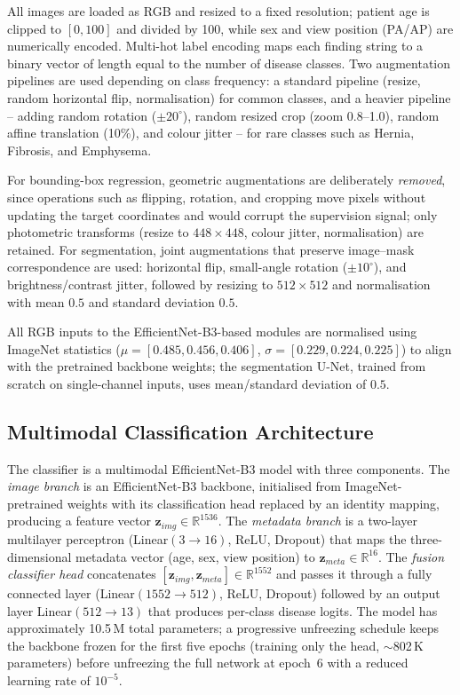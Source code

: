 \documentclass[preprint,12pt,authoryear]{elsarticle}
\begin{document}
All images are loaded as RGB and resized to a fixed resolution; patient age is clipped to $[0, 100]$ and divided by 100, while sex and view position (PA/AP) are numerically encoded. Multi-hot label encoding maps each finding string to a binary vector of length equal to the number of disease classes. Two augmentation pipelines are used depending on class frequency: a standard pipeline (resize, random horizontal flip, normalisation) for common classes, and a heavier pipeline -- adding random rotation ($\pm20^{\circ}$), random resized crop (zoom 0.8--1.0), random affine translation (10\%), and colour jitter -- for rare classes such as Hernia, Fibrosis, and Emphysema.

For bounding-box regression, geometric augmentations are deliberately \emph{removed}, since operations such as flipping, rotation, and cropping move pixels without updating the target coordinates and would corrupt the supervision signal; only photometric transforms (resize to $448\times448$, colour jitter, normalisation) are retained. For segmentation, joint augmentations that preserve image--mask correspondence are used: horizontal flip, small-angle rotation ($\pm10^{\circ}$), and brightness/contrast jitter, followed by resizing to $512\times512$ and normalisation with mean $0.5$ and standard deviation $0.5$.

All RGB inputs to the EfficientNet-B3-based modules are normalised using ImageNet statistics ($\mu = [0.485, 0.456, 0.406]$, $\sigma = [0.229, 0.224, 0.225]$) to align with the pretrained backbone weights; the segmentation U-Net, trained from scratch on single-channel inputs, uses mean/standard deviation of $0.5$.

\subsection{Multimodal Classification Architecture}
\label{sec:classifier-arch}

The classifier is a multimodal EfficientNet-B3 model with three components. The \emph{image branch} is an EfficientNet-B3 backbone, initialised from ImageNet-pretrained weights with its classification head replaced by an identity mapping, producing a feature vector $\mathbf{z}_{img} \in \mathbb{R}^{1536}$. The \emph{metadata branch} is a two-layer multilayer perceptron (Linear$(3\rightarrow16)$, ReLU, Dropout) that maps the three-dimensional metadata vector (age, sex, view position) to $\mathbf{z}_{meta} \in \mathbb{R}^{16}$. The \emph{fusion classifier head} concatenates $[\mathbf{z}_{img}, \mathbf{z}_{meta}] \in \mathbb{R}^{1552}$ and passes it through a fully connected layer (Linear$(1552\rightarrow512)$, ReLU, Dropout) followed by an output layer Linear$(512\rightarrow13)$ that produces per-class disease logits. The model has approximately 10.5\,M total parameters; a progressive unfreezing schedule keeps the backbone frozen for the first five epochs (training only the head, $\sim$802\,K parameters) before unfreezing the full network at epoch~6 with a reduced learning rate of $10^{-5}$.
\end{document}
